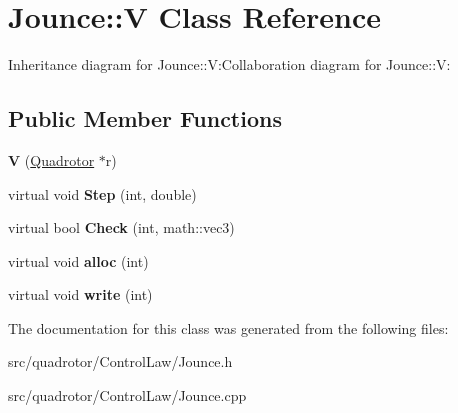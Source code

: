 \hypertarget{classJounce_1_1V}{
\section{Jounce::V Class Reference}
\label{classJounce_1_1V}
}
Inheritance diagram for Jounce::V:Collaboration diagram for Jounce::V:\subsection*{Public Member Functions}
\begin{DoxyCompactItemize}
\item 
\hypertarget{classJounce_1_1V_a1cb67cc154796091ff5b571b0cafa184}{
{\bfseries V} (\hyperlink{classQuadrotor}{Quadrotor} $\ast$r)}
\label{classJounce_1_1V_a1cb67cc154796091ff5b571b0cafa184}

\item 
\hypertarget{classJounce_1_1V_a51b032ee7b0f6bf93f28c764ea117c11}{
virtual void {\bfseries Step} (int, double)}
\label{classJounce_1_1V_a51b032ee7b0f6bf93f28c764ea117c11}

\item 
\hypertarget{classJounce_1_1V_a504f05fe2b80328d863eacddfb15b555}{
virtual bool {\bfseries Check} (int, math::vec3)}
\label{classJounce_1_1V_a504f05fe2b80328d863eacddfb15b555}

\item 
\hypertarget{classJounce_1_1V_af93b8cc4b4609e4b4ee04a635656a0da}{
virtual void {\bfseries alloc} (int)}
\label{classJounce_1_1V_af93b8cc4b4609e4b4ee04a635656a0da}

\item 
\hypertarget{classJounce_1_1V_a25a4b61e80beb56af2a9ad1fc5a1d270}{
virtual void {\bfseries write} (int)}
\label{classJounce_1_1V_a25a4b61e80beb56af2a9ad1fc5a1d270}

\end{DoxyCompactItemize}


The documentation for this class was generated from the following files:\begin{DoxyCompactItemize}
\item 
src/quadrotor/ControlLaw/Jounce.h\item 
src/quadrotor/ControlLaw/Jounce.cpp\end{DoxyCompactItemize}
